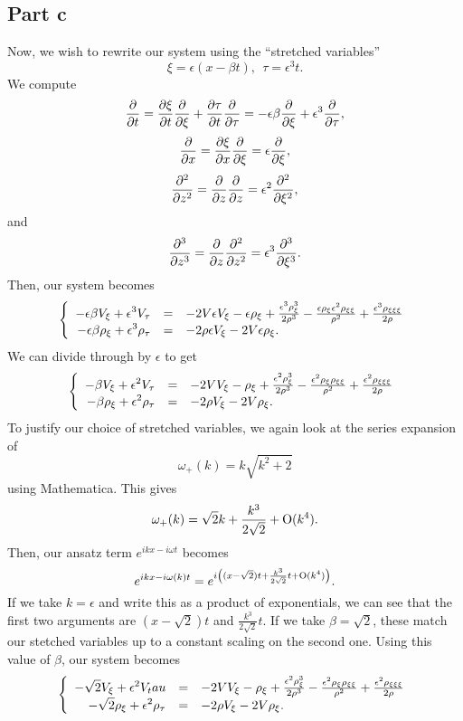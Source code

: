 \documentclass{article}
\begin{document}
\subsection{Part c}
Now, we wish to rewrite our system using the ``stretched variables''
\[
\xi=\epsilon(x-\beta t), ~~\tau=\epsilon^{3} t.
\]
We compute
\begin{align*}
	\frac{\partial }{\partial t}=\frac{\partial \xi}{\partial t}\frac{\partial }{\partial \xi}+\frac{\partial \tau}{\partial t}\frac{\partial }{\partial \tau}=-\epsilon\beta\frac{\partial }{\partial \xi}+\epsilon^{3}\frac{\partial }{\partial \tau},
\end{align*}
\[
\frac{\partial }{\partial x}=\frac{\partial \xi}{\partial x}\frac{\partial }{\partial \xi}=\epsilon\frac{\partial }{\partial \xi},
\]
\begin{align*}
	\frac{\partial^{2} } {\partial z^{2}}=\frac{\partial }{\partial z}\frac{\partial }{\partial z}=\epsilon^2\frac{\partial^{2} } {\partial \xi^{2}},
\end{align*}
and
\begin{align*}
	\frac{\partial^{3} } {\partial z^{3}}=\frac{\partial }{\partial z}\frac{\partial^{2} } {\partial z^{2}}=\epsilon^3\frac{\partial^{3} } {\partial \xi^{3}}.
\end{align*}
Then, our system becomes
\[
\left\{\begin{array}{rcl}
	\displaystyle -\epsilon\beta V_\xi+\epsilon^3V_\tau&=&-2V\epsilon V_\xi-\epsilon\rho_\xi+\frac{\epsilon^3\rho_\xi^3}{2\rho^3}-\frac{\epsilon\rho_\xi\epsilon^2\rho_{\xi\xi}}{\rho^2}+\frac{\epsilon^3\rho_{\xi\xi\xi}}{2\rho}\\
	\displaystyle -\epsilon\beta \rho_\xi+\epsilon^3\rho_\tau&=&\displaystyle -2\rho \epsilon V_\xi-2V\epsilon\rho_\xi.
\end{array}\right.
\]
We can divide through by $\epsilon$ to get
\[
\left\{\begin{array}{rcl}
	\displaystyle -\beta V_\xi+\epsilon^2V_\tau&=&-2V V_\xi-\rho_\xi+\frac{\epsilon^2\rho_\xi^3}{2\rho^3}-\frac{\epsilon^2\rho_\xi\rho_{\xi\xi}}{\rho^2}+\frac{\epsilon^2\rho_{\xi\xi\xi}}{2\rho}\\
	\displaystyle -\beta \rho_\xi+\epsilon^2\rho_\tau&=&\displaystyle -2\rho V_\xi-2V\rho_\xi.
\end{array}\right.
\]
To justify our choice of stretched variables, we again look at the series expansion of 
\[
\omega_+(k)=k\sqrt{k^2+2}
\]
using Mathematica. This gives
\[
\omega_+(k)=\sqrt{2}k+\frac{k^3}{2\sqrt{2}}+\operatorname{O}(k^4).
\]
Then, our ansatz term $e^{ikx-i\omega t}$ becomes
\[
e^{ikx-i\omega(k)t}=e^{i\left((x-\sqrt{2})t+\frac{k^3}{2\sqrt{2}}t+\operatorname{O}(k^4)\right)}.
\]
If we take $k=\epsilon$ and write this as a product of exponentials, we can see that the first two arguments are $(x-\sqrt{2})t$ and $\frac{k^3}{2\sqrt{2}}t$. If we take $\beta=\sqrt{2}$, these match our stetched variables up to a constant scaling on the second one. Using this value of $\beta$, our system becomes
\[
\left\{\begin{array}{rcl}
	\displaystyle -\sqrt{2} V_\xi+\epsilon^2V_tau&=&-2V V_\xi-\rho_\xi+\frac{\epsilon^2\rho_\xi^3}{2\rho^3}-\frac{\epsilon^2\rho_\xi\rho_{\xi\xi}}{\rho^2}+\frac{\epsilon^2\rho_{\xi\xi\xi}}{2\rho}\\
	\displaystyle -\sqrt{2} \rho_\xi+\epsilon^2\rho_\tau&=&\displaystyle -2\rho V_\xi-2V\rho_\xi.
\end{array}\right.
\]
\end{document}
